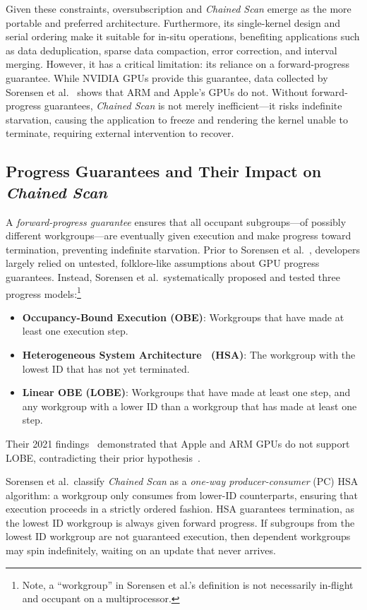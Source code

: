 \documentclass[acmsmall, manuscript, screen, review, anonymous]{acmart}
\begin{document}
Given these constraints, oversubscription and \emph{Chained Scan} emerge as the more portable and preferred architecture. Furthermore, its single-kernel design and serial ordering make it suitable for in-situ operations, benefiting applications such as data deduplication, sparse data compaction, error correction, and interval merging. However, it has a critical limitation: its reliance on a forward-progress guarantee. While NVIDIA GPUs provide this guarantee, data collected by Sorensen et al.~\cite{sorensen2021} shows that ARM and Apple's GPUs do not. Without forward-progress guarantees, \emph{Chained Scan} is not merely inefficient---it risks indefinite starvation, causing the application to freeze and rendering the kernel unable to terminate, requiring external intervention to recover.

\subsection{Progress Guarantees and Their Impact on \emph{Chained Scan}}
A \emph{forward-progress guarantee} ensures that all occupant subgroups---of possibly different workgroups---are eventually given execution and make progress toward termination, preventing indefinite starvation. Prior to Sorensen et al.~\cite{sorensen2018,sorensen2021}, developers largely relied on untested, folklore-like assumptions about GPU progress guarantees. Instead, Sorensen et al.\ systematically proposed and tested three progress models:\footnote{Note, a ``workgroup'' in Sorensen et al.'s definition is not necessarily in-flight and occupant on a multiprocessor.}
\begin{itemize}
  \item \textbf{Occupancy-Bound Execution (OBE)}: Workgroups that have made at least one execution step.
  \item \textbf{Heterogeneous System Architecture~\cite[Section~2.11]{HSASysArch12} (HSA)}: The workgroup with the lowest ID that has not yet terminated.
  \item \textbf{Linear OBE (LOBE)}: Workgroups that have made at least one step, and any workgroup with a lower ID than a workgroup that has made at least one step.
\end{itemize}
Their 2021 findings~\cite{sorensen2021} demonstrated that Apple and ARM GPUs do not support LOBE, contradicting their prior hypothesis~\cite{sorensen2018}.

Sorensen et al.\ classify \emph{Chained Scan} as a \emph{one-way producer-consumer} (PC) HSA algorithm: a workgroup only consumes from lower-ID counterparts, ensuring that execution proceeds in a strictly ordered fashion. HSA guarantees termination, as the lowest ID workgroup is always given forward progress. If subgroups from the lowest ID workgroup are not guaranteed execution, then dependent workgroups may spin indefinitely, waiting on an update that never arrives.
\end{document}
